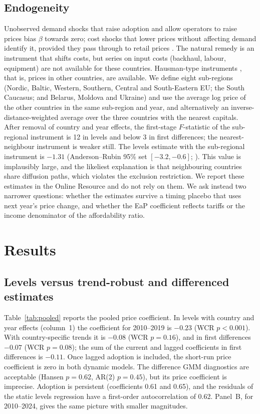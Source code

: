 \documentclass[pdflatex,sn-basic]{sn-jnl}
\begin{document}
\subsection{Endogeneity}

Unobserved demand shocks that raise adoption and allow operators to raise prices bias $\beta$ towards zero; cost shocks that lower prices without affecting demand identify it, provided they pass through to retail prices \citep{beard2005flow}. The natural remedy is an instrument that shifts costs, but series on input costs (backhaul, labour, equipment) are not available for these countries. Hausman-type instruments \citep{hausman1996valuation,nevo2001measuring}, that is, prices in other countries, are available. We define eight sub-regions (Nordic, Baltic, Western, Southern, Central and South-Eastern EU; the South Caucasus; and Belarus, Moldova and Ukraine) and use the average log price of the other countries in the same sub-region and year, and alternatively an inverse-distance-weighted average over the three countries with the nearest capitals. After removal of country and year effects, the first-stage $F$-statistic of the sub-regional instrument is 12 in levels and below 3 in first differences; the nearest-neighbour instrument is weaker still. The levels estimate with the sub-regional instrument is $-1.31$ (Anderson--Rubin 95\% set $[-3.2, -0.6]$; \citealp{anderson1949estimation}). This value is implausibly large, and the likeliest explanation is that neighbouring countries share diffusion paths, which violates the exclusion restriction. We report these estimates in the Online Resource and do not rely on them. We ask instead two narrower questions: whether the estimates survive a timing placebo that uses next year's price change, and whether the EaP coefficient reflects tariffs or the income denominator of the affordability ratio.

\section{Results}\label{sec:results}

\subsection{Levels versus trend-robust and differenced estimates}

Table~\ref{tab:pooled} reports the pooled price coefficient. In levels with country and year effects (column~1) the coefficient for 2010--2019 is $-0.23$ (WCR $p<0.001$). With country-specific trends it is $-0.08$ (WCR $p=0.16$), and in first differences $-0.07$ (WCR $p=0.08$); the sum of the current and lagged coefficients in first differences is $-0.11$. Once lagged adoption is included, the short-run price coefficient is zero in both dynamic models. The difference GMM diagnostics are acceptable (Hansen $p=0.62$, AR(2) $p=0.45$), but its price coefficient is imprecise. Adoption is persistent (coefficients 0.61 and 0.65), and the residuals of the static levels regression have a first-order autocorrelation of 0.62. Panel~B, for 2010--2024, gives the same picture with smaller magnitudes.
\end{document}
